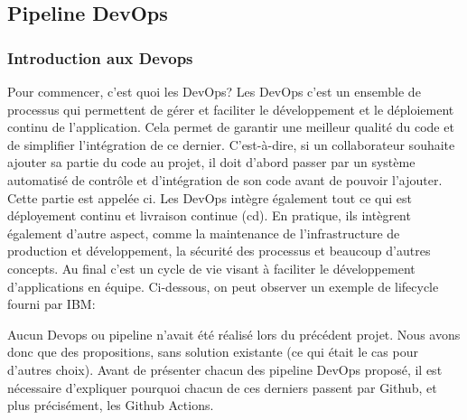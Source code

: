 \documentclass[
    iai, %
    il, %
]{heig-tb}
\begin{document}
\clearpage
\subsection{Pipeline DevOps}
\subsubsection{Introduction aux Devops}
Pour commencer, c'est quoi les DevOps?\newline
Les DevOps c'est un ensemble de processus qui permettent de gérer et faciliter le développement et le déploiement continu de l'application. Cela permet de garantir une meilleur qualité du code et de simplifier l'intégration de ce dernier. C'est-à-dire, si un collaborateur souhaite ajouter sa partie du code au projet, il doit d'abord passer par un système automatisé de contrôle et d'intégration de son code avant de pouvoir l'ajouter. Cette partie est appelée \Gls{ci}.\newline
Les DevOps intègre également tout ce qui est déployement continu et livraison continue (\Gls{cd}).
En pratique, ils intègrent également d'autre aspect, comme la maintenance de l'infrastructure de production et développement, la sécurité des processus et beaucoup d'autres concepts.\newline
Au final c'est un cycle de vie visant à faciliter le développement d'applications en équipe.\newline
Ci-dessous, on peut observer un exemple de lifecycle fourni par IBM:


Aucun Devops ou pipeline n'avait été réalisé lors du précédent projet.
Nous avons donc que des propositions, sans solution existante (ce qui était le cas pour d'autres choix).\newline
Avant de présenter chacun des pipeline DevOps proposé, il est nécessaire d'expliquer pourquoi chacun de ces derniers passent par Github, et plus précisément, les Github Actions.
\end{document}
